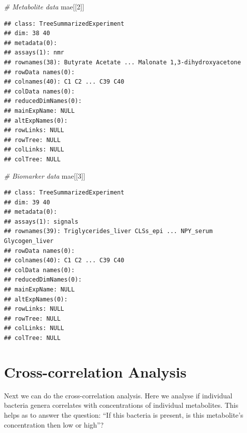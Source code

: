 \documentclass[
]{book}
\newenvironment{Shaded}{\begin{snugshade}}{\end{snugshade}}
\newcommand{\CommentTok}[1]{\textcolor[rgb]{0.56,0.35,0.01}{\textit{#1}}}
\newcommand{\DecValTok}[1]{\textcolor[rgb]{0.00,0.00,0.81}{#1}}
\newcommand{\NormalTok}[1]{#1}
\begin{document}
\begin{Shaded}
\begin{Highlighting}[]
\CommentTok{\# Metabolite data}
\NormalTok{mae[[}\DecValTok{2}\NormalTok{]]}
\end{Highlighting}
\end{Shaded}

\begin{verbatim}
## class: TreeSummarizedExperiment 
## dim: 38 40 
## metadata(0):
## assays(1): nmr
## rownames(38): Butyrate Acetate ... Malonate 1,3-dihydroxyacetone
## rowData names(0):
## colnames(40): C1 C2 ... C39 C40
## colData names(0):
## reducedDimNames(0):
## mainExpName: NULL
## altExpNames(0):
## rowLinks: NULL
## rowTree: NULL
## colLinks: NULL
## colTree: NULL
\end{verbatim}

\begin{Shaded}
\begin{Highlighting}[]
\CommentTok{\# Biomarker data}
\NormalTok{mae[[}\DecValTok{3}\NormalTok{]]}
\end{Highlighting}
\end{Shaded}

\begin{verbatim}
## class: TreeSummarizedExperiment 
## dim: 39 40 
## metadata(0):
## assays(1): signals
## rownames(39): Triglycerides_liver CLSs_epi ... NPY_serum Glycogen_liver
## rowData names(0):
## colnames(40): C1 C2 ... C39 C40
## colData names(0):
## reducedDimNames(0):
## mainExpName: NULL
## altExpNames(0):
## rowLinks: NULL
## rowTree: NULL
## colLinks: NULL
## colTree: NULL
\end{verbatim}

\hypertarget{cross-correlation-analysis}{%
\section{Cross-correlation Analysis}\label{cross-correlation-analysis}}

Next we can do the cross-correlation analysis. Here we analyse if
individual bacteria genera correlates with concentrations of
individual metabolites. This helps as to answer the question: ``If this
bacteria is present, is this metabolite's concentration then low or
high''?
\end{document}
